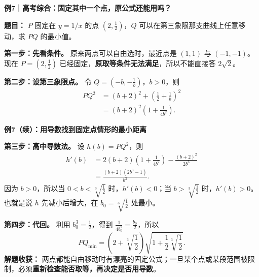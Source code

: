 \clearpage
\begin{examplebox}
\textbf{例7｜高考综合：固定其中一个点，原公式还能用吗？}



\textbf{题目：} $P$ 固定在 $y=1/x$ 的点 $(2,\frac12)$，$Q$ 可以在第三象限那支曲线上任意移动，求 $PQ$ 的最小值。

\textbf{第一步：先看条件。} 原来两点可以自由选时，最近点是 $(1,1)$ 与 $(-1,-1)$。现在 $P=(2,\frac12)$ 已经固定，\textbf{原取等条件无法满足}，所以不能直接答 $2\sqrt2$。

\textbf{第二步：设第三象限点。} 令 $Q=(-b,-\frac1b)$，$b>0$，则
\[
\begin{aligned}
PQ^2&=(b+2)^2+\left(\frac12+\frac1b\right)^2\\
&=(b+2)^2\left(1+\frac1{4b^2}\right).
\end{aligned}
\]
\end{examplebox}
\clearpage
\begin{examplebox}
\textbf{例7（续）：用导数找到固定点情形的最小距离}

\textbf{第三步：高中导数法。} 设 $h(b)=PQ^2$，则
\[
\begin{aligned}
h'(b)&=2(b+2)\left(1+\frac1{4b^2}\right)
-\frac{(b+2)^2}{2b^3}\\
&=\frac{(b+2)(2b^3-1)}{b^3}.
\end{aligned}
\]
因为 $b>0$，所以当 $0<b<\sqrt[3]{\frac12}$ 时，$h'(b)<0$；当 $b>\sqrt[3]{\frac12}$ 时，$h'(b)>0$。也就是说 $h$ 先减小后增大，在 $b_0=\sqrt[3]{\frac12}$ 处最小。

\textbf{第四步：代回。} 利用 $b_0^3=\frac12$，得到 $\frac1{4b_0^2}=\frac{b_0}{2}$，所以
\[
\boxed{PQ_{\min}=\left(2+\sqrt[3]{\frac12}\right)
\sqrt{1+\frac12\sqrt[3]{\frac12}}}.
\]
\textbf{解题收获：} 两点都能自由移动时有漂亮的固定公式；一旦某个点或某段范围被限制，必须\textbf{重新检查能否取等，再决定是否用导数}。
\end{examplebox}


